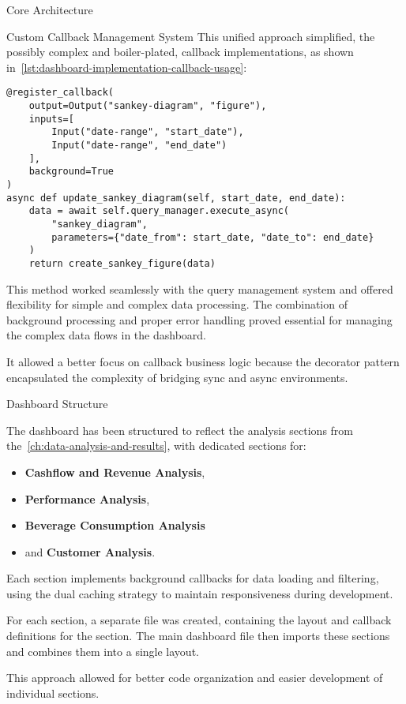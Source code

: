 \begin{section}{Core Architecture}
\begin{subsection}{Custom Callback Management System}
		This unified approach simplified, the possibly complex and boiler-plated, callback implementations, as shown in~\autoref{lst:dashboard-implementation-callback-usage}:

		\begin{listing}[H]
			\caption{Callback Registration Example}
			\begin{verbatim}
@register_callback(
    output=Output("sankey-diagram", "figure"),
    inputs=[
        Input("date-range", "start_date"),
        Input("date-range", "end_date")
    ],
    background=True
)
async def update_sankey_diagram(self, start_date, end_date):
    data = await self.query_manager.execute_async(
        "sankey_diagram",
        parameters={"date_from": start_date, "date_to": end_date}
    )
    return create_sankey_figure(data)
			\end{verbatim}
			\label{lst:dashboard-implementation-callback-usage}
		\end{listing}

		This method worked seamlessly with the query management system and offered flexibility for simple and complex data processing.
		The combination of background processing and proper error handling proved essential for managing the complex data flows in the dashboard.

		It allowed a better focus on callback business logic because the decorator pattern encapsulated the complexity of bridging sync and async environments.
	\end{subsection}

	\begin{subsection}{Dashboard Structure}
		\label{subsec:implementation-core-architecture-structure}

		The dashboard has been structured to reflect the analysis sections from the~\autoref{ch:data-analysis-and-results}, with dedicated sections for:
		\begin{itemize}
			\item \textbf{Cashflow and Revenue Analysis},
			\item \textbf{Performance Analysis},
			\item \textbf{Beverage Consumption Analysis}
			\item and \textbf{Customer Analysis}.
		\end{itemize}

		Each section implements background callbacks for data loading and filtering, using the dual caching strategy to maintain responsiveness during development.

		For each section, a separate file was created, containing the layout and callback definitions for the section.
		The main dashboard file then imports these sections and combines them into a single layout.

		This approach allowed for better code organization and easier development of individual sections.
	\end{subsection}
\end{section}

